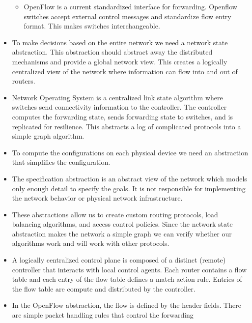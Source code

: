 \begin{itemize}
  \begin{itemize}
  \tightlist
  \item
    OpenFlow is a current standardized interface for forwarding.
    Openflow switches accept external control messages and standardize
    flow entry format. This makes switches interchangeable.
  \end{itemize}
\item
  To make decisions based on the entire network we need a network state
  abstraction. This abstraction should abstract away the distributed
  mechanisms and provide a global network view. This creates a logically
  centralized view of the network where information can flow into and
  out of routers.
\item
  Network Operating System is a centralized link state algorithm where
  switches send connectivity information to the controller. The
  controller computes the forwarding state, sends forwarding state to
  switches, and is replicated for resilience. This abstracts a log of
  complicated protocols into a simple graph algorithm.
\item
  To compute the configurations on each physical device we need an
  abstraction that simplifies the configuration.
\item
  The specification abstraction is an abstract view of the network which
  models only enough detail to specify the goals. It is not responsible
  for implementing the network behavior or physical network
  infrastructure.
\item
  These abstractions allow us to create custom routing protocols, load
  balancing algorithms, and access control policies. Since the network
  state abstraction makes the network a simple graph we can verify
  whether our algorithms work and will work with other protocols.
\item
  A logically centralized control plane is composed of a distinct
  (remote) controller that interacts with local control agents. Each
  router contains a flow table and each entry of the flow table defines
  a match action rule. Entries of the flow table are compute and
  distributed by the controller.
\item
  In the OpenFlow abstraction, the flow is defined by the header fields.
  There are simple packet handling rules that control the forwarding


\end{itemize}
